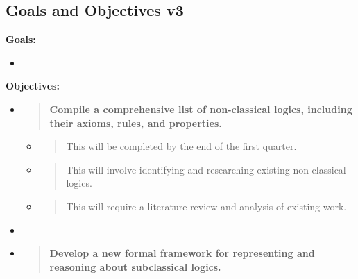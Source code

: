 \hypertarget{goals-and-objectives-v3}{%
\subsection{Goals and Objectives v3}\label{goals-and-objectives-v3}}

\textbf{Goals:}

\begin{itemize}
\tightlist
\item
\end{itemize}

\textbf{Objectives:}

\begin{itemize}
\item
  \begin{quote}
  \textbf{Compile a comprehensive list of non-classical logics,
  including their axioms, rules, and properties.\\
  }
  \end{quote}

  \begin{itemize}
  \item
    \begin{quote}
    This will be completed by the end of the first quarter.
    \end{quote}
  \item
    \begin{quote}
    This will involve identifying and researching existing non-classical
    logics.
    \end{quote}
  \item
    \begin{quote}
    This will require a literature review and analysis of existing work.
    \end{quote}
  \end{itemize}
\item
\item
  \begin{quote}
  \textbf{Develop a new formal framework for representing and reasoning
  about subclassical logics.\\
  }
  \end{quote}


\end{itemize}
